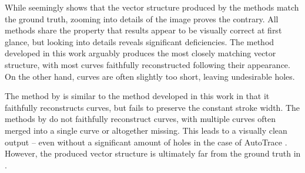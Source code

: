 While  seemingly shows that the vector structure produced by the methods match the ground truth, zooming into details of the image proves the contrary. All methods share the property that results appear to be visually correct at first glance, but looking into details reveals significant deficiencies. The method developed in this work arguably produces the most closely matching vector structure, with most curves faithfully reconstructed following their appearance. On the other hand, curves are often slightly too short, leaving undesirable holes.

The method by \citet{mo2021virtualsketching} is similar to the method developed in this work in that it faithfully reconstructs curves, but fails to preserve the constant stroke width. The methods by \citet{autotrace,Puhachov2021KeypointPolyvector} do not faithfully reconstruct curves, with multiple curves often merged into a single curve or altogether missing. This leads to a visually clean output -- even without a significant amount of holes in the case of AutoTrace \citep{autotrace}. However, the produced vector structure is ultimately far from the ground truth in .

